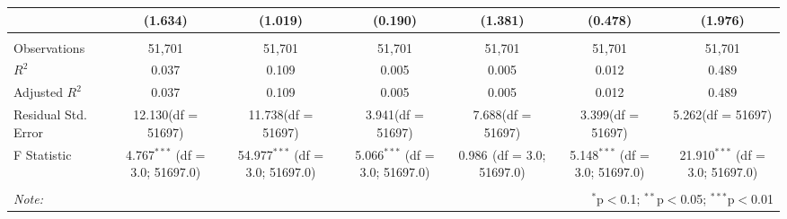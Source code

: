 \documentclass[12pt]{article}
\begin{document}
\begin{table}[!htbp]
\begin{tabular}{@{\extracolsep{5pt}}lcccccc}
  & (1.634) & (1.019) & (0.190) & (1.381) & (0.478) & (1.976) \\
\hline \\[-1.8ex]
 Observations & 51,701 & 51,701 & 51,701 & 51,701 & 51,701 & 51,701 \\
 $R^2$ & 0.037 & 0.109 & 0.005 & 0.005 & 0.012 & 0.489 \\
 Adjusted $R^2$ & 0.037 & 0.109 & 0.005 & 0.005 & 0.012 & 0.489 \\
 Residual Std. Error & 12.130(df = 51697) & 11.738(df = 51697) & 3.941(df = 51697) & 7.688(df = 51697) & 3.399(df = 51697) & 5.262(df = 51697)  \\
 F Statistic & 4.767$^{***}$ (df = 3.0; 51697.0) & 54.977$^{***}$ (df = 3.0; 51697.0) & 5.066$^{***}$ (df = 3.0; 51697.0) & 0.986$^{}$ (df = 3.0; 51697.0) & 5.148$^{***}$ (df = 3.0; 51697.0) & 21.910$^{***}$ (df = 3.0; 51697.0) \\
\hline
\hline \\[-1.8ex]
\textit{Note:} & \multicolumn{6}{r}{$^{*}$p$<$0.1; $^{**}$p$<$0.05; $^{***}$p$<$0.01} \\
\end{tabular}
\end{table}
\end{document}
